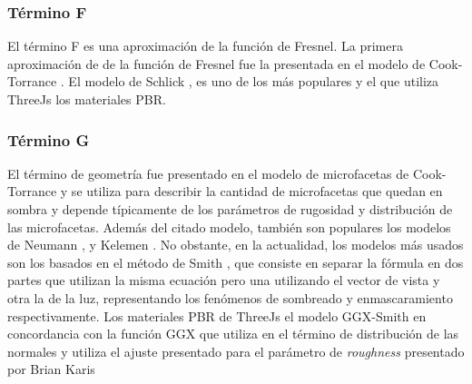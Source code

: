         \subsubsection*{T\'ermino F}
            El t\'ermino F es una aproximaci\'on de la funci\'on de Fresnel. La primera aproximaci\'on de de la funci\'on de Fresnel
            fue la presentada en el modelo de Cook-Torrance \autocite{cooktorrance}. El modelo de Schlick \autocite{schlick}, es uno de
            los m\'as populares y el que utiliza ThreeJs los materiales PBR.
            

        \subsubsection*{T\'ermino G}
            El t\'ermino de geometr\'ia fue presentado en el modelo de microfacetas de Cook-Torrance \autocite{cooktorrance}
            y se utiliza para describir la cantidad de microfacetas que quedan en sombra y depende t\'ipicamente de los par\'ametros
            de rugosidad y distribuci\'on de las microfacetas. Adem\'as del citado modelo, tambi\'en son populares los modelos de
            Neumann \autocite{neumann}, y Kelemen \autocite{kelemen}. No obstante, en la actualidad, los modelos m\'as usados son los
            basados en el m\'etodo de Smith \autocite{smith}, que consiste en separar la f\'ormula en dos partes que utilizan la misma
            ecuaci\'on pero una utilizando el vector de vista y otra la de la luz, representando los fen\'omenos de sombreado y
            enmascaramiento respectivamente. Los materiales PBR de ThreeJs el modelo GGX-Smith \autocite{walter} en concordancia con
            la funci\'on GGX \autocite{ggx} que utiliza en el t\'ermino de distribuci\'on de las normales y utiliza el ajuste
            presentado para el par\'ametro de \textit{roughness} presentado por Brian Karis \autocite{unreal}
            
            

